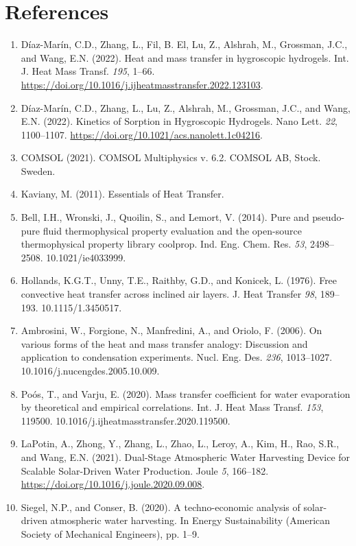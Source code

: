 \documentclass[11pt]{article}
\begin{document}
\clearpage
\section*{References}

\begin{enumerate}[leftmargin=2em,itemsep=0.25em]
\item Díaz-Marín, C.D., Zhang, L., Fil, B. El, Lu, Z., Alshrah, M., Grossman, J.C., and Wang, E.N. (2022). Heat and mass transfer in hygroscopic hydrogels. Int. J. Heat Mass Transf. \textit{195}, 1--66. \url{https://doi.org/10.1016/j.ijheatmasstransfer.2022.123103}.
\item Díaz-Marín, C.D., Zhang, L., Lu, Z., Alshrah, M., Grossman, J.C., and Wang, E.N. (2022). Kinetics of Sorption in Hygroscopic Hydrogels. Nano Lett. \textit{22}, 1100--1107. \url{https://doi.org/10.1021/acs.nanolett.1c04216}.
\item COMSOL (2021). COMSOL Multiphysics\textregistered{} v. 6.2. COMSOL AB, Stock. Sweden.
\item Kaviany, M. (2011). Essentials of Heat Transfer.
\item Bell, I.H., Wronski, J., Quoilin, S., and Lemort, V. (2014). Pure and pseudo-pure fluid thermophysical property evaluation and the open-source thermophysical property library coolprop. Ind. Eng. Chem. Res. \textit{53}, 2498--2508. 10.1021/ie4033999.
\item Hollands, K.G.T., Unny, T.E., Raithby, G.D., and Konicek, L. (1976). Free convective heat transfer across inclined air layers. J. Heat Transfer \textit{98}, 189--193. 10.1115/1.3450517.
\item Ambrosini, W., Forgione, N., Manfredini, A., and Oriolo, F. (2006). On various forms of the heat and mass transfer analogy: Discussion and application to condensation experiments. Nucl. Eng. Des. \textit{236}, 1013--1027. 10.1016/j.nucengdes.2005.10.009.
\item Poós, T., and Varju, E. (2020). Mass transfer coefficient for water evaporation by theoretical and empirical correlations. Int. J. Heat Mass Transf. \textit{153}, 119500. 10.1016/j.ijheatmasstransfer.2020.119500.
\item LaPotin, A., Zhong, Y., Zhang, L., Zhao, L., Leroy, A., Kim, H., Rao, S.R., and Wang, E.N. (2021). Dual-Stage Atmospheric Water Harvesting Device for Scalable Solar-Driven Water Production. Joule \textit{5}, 166--182. \url{https://doi.org/10.1016/j.joule.2020.09.008}.
\item Siegel, N.P., and Conser, B. (2020). A techno-economic analysis of solar-driven atmospheric water harvesting. In Energy Sustainability (American Society of Mechanical Engineers), pp. 1--9.

\end{enumerate}
\end{document}
